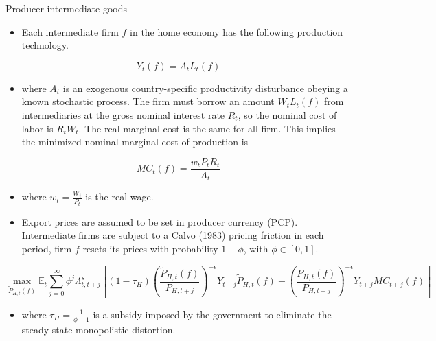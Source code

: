 \documentclass[10pt]{beamer}
\begin{document}
\begin{frame}{Producer-intermediate goods}

\fontsize{8}{8}\selectfont

\begin{itemize}
    \item Each intermediate firm $f$ in the home economy has the following production technology.
\end{itemize}

$$
Y_{t}(f)=A_{t} L_{t}(f)
$$

\begin{itemize}
    \item where $A_{t}$ is an exogenous country-specific productivity disturbance obeying a known stochastic process. The firm must borrow an amount $W_tL_t(f)$ from intermediaries at the gross nominal interest rate $R_t$, so the nominal cost of labor is $R_tW_t$. The real marginal cost is the same for all firm. This implies the minimized nominal marginal cost of production is
\end{itemize}

$$
M C_{t}(f)=\frac{w_{t} P_{t}R_{t}}{A_{t}}
$$

\begin{itemize}
    \item where $w_{t}=\frac{W_{t}}{P_{t}}$ is the real wage.
\end{itemize}


\begin{itemize}
    \item Export prices are assumed to be set in producer currency (PCP). Intermediate firms are subject to a Calvo (1983) pricing friction in each period, firm $f$ resets its prices with probability $1-\phi$, with $\phi \in[0,1]$.
\end{itemize}

$$
\max _{\tilde{P}_{H, t}(f)} \mathbb{E}_{t} \sum_{j=0}^{\infty} \phi^{j} \Lambda_{t, t+j}^{s}\left[\left(1-\tau_{H}\right)\left(\frac{\tilde{P}_{H, t}(f)}{P_{H, t+j}}\right)^{-\epsilon} Y_{t+j} \tilde{P}_{H, t}(f)-\left(\frac{\tilde{P}_{H, t}(f)}{P_{H, t+j}}\right)^{-\epsilon} Y_{t+j} M C_{t+j}(f)\right]
$$

\begin{itemize}
    \item where $\tau_{H}=\frac{1}{\phi-1}$ is a subsidy imposed by the government to eliminate the steady state monopolistic distortion.
\end{itemize}

\end{frame}
\end{document}
